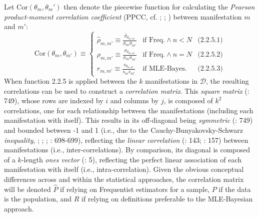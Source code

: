 \documentclass[
  10pt,
  a4paper,
  twoside]{article}
\begin{document}
Let \(\text{Cor}(\theta_m, \theta_m')\) then denote the piecewise function for calculating the \emph{Pearson product-moment correlation coefficient} (PPCC, cf. ; ; ) between manifestation \(m\) and \(m'\):
\[
\text{Cor}(\theta_m, \theta_{m'}) \equiv
\left\{
\begin{array}{lll}
  \hat{\rho}_{m,m'} \equiv \frac{\hat{\sigma}_{\theta_{m,m'}}}{\hat{\sigma}_m \hat{\sigma}_{m'}} & \text{if Freq.} \land n < N & \text{(2.2.5.1)} \\
  \rho_{m,m'} \equiv \frac{\sigma_{\theta_{m,m'}}}{\sigma_m \sigma_{m'}} & \text{if Freq.} \land n = N & \text{(2.2.5.2)} \\
  r_{m,m'} \equiv \frac{s_{\theta_{m,m'}}}{s_m s_{m'}} & \text{if MLE-Bayes.} & \text{(2.2.5.3)}
\end{array}
\right.
\tag{2.2.5}
\]
When function 2.2.5 is applied between the \(k\) manifestations in \(\mathcal{D}\), the resulting correlations can be used to construct a \emph{correlation matrix}. This \emph{square matrix} (: 749), whose rows are indexed by \(i\) and columns by \(j\), is composed of \(k^2\) correlations, one for each relationship between the manifestations (including each manifestation with itself). This results in its off-diagonal being \emph{symmetric} (: 749) and bounded between -1 and 1 (i.e., due to the Cauchy-Bunyakovsky-Schwarz \emph{inequality}, ; ; ; : 698-699), reflecting the \emph{linear correlation} (: 143; : 157) between manifestations (i.e., inter-correlations). By comparison, its diagonal is composed of a \(k\)-length \emph{ones vector} (: 5), reflecting the perfect linear association of each manifestation with itself (i.e., intra-correlation). Given the obvious conceptual differences across and within the statistical approaches, the correlation matrix will be denoted \(\hat{P}\) if relying on Frequentist estimators for a sample, \(P\) if the data is the population, and \(R\) if relying on definitions preferable to the MLE-Bayesian approach.
\end{document}
